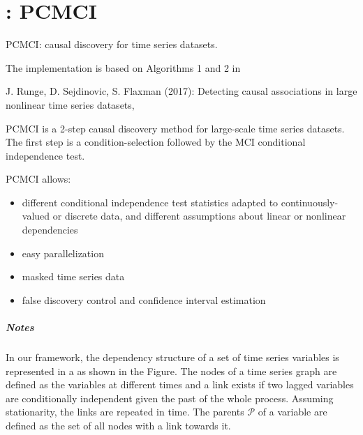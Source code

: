 \documentclass[letterpaper,10pt,english]{sphinxmanual}
\begin{document}
\chapter{: PCMCI}
\label{\detokenize{index:tigramite}}\label{\detokenize{index:tigramite-pcmci-pcmci}}

\begin{fulllineitems}
\label{\detokenize{index:tigramite.pcmci.PCMCI}}
PCMCI: causal discovery for time series datasets.

The implementation is based on Algorithms 1 and 2 in %
\begin{footnote}[1]\sphinxAtStartFootnote
J. Runge, D. Sejdinovic, S. Flaxman (2017): Detecting causal
associations in large nonlinear time series datasets,
%
\end{footnote}

PCMCI is a 2-step causal discovery method for large-scale time series
datasets. The first step is a condition-selection followed by the MCI
conditional independence test.

PCMCI allows:
\begin{itemize}
\item {} 
different conditional independence test statistics adapted to
continuously-valued or discrete data, and different assumptions about
linear or nonlinear dependencies

\item {} 
easy parallelization

\item {} 
masked time series data

\item {} 
false discovery control and confidence interval estimation

\end{itemize}
\paragraph{Notes}

\noindent{}

In our framework, the dependency structure of a set of time series variables
is represented in a  as shown in the Figure. The nodes of
a time series graph are defined as the variables at different times and a
link exists if two lagged variables are  conditionally independent
given the past of the whole process. Assuming stationarity, the links are
repeated in time. The parents \(\mathcal{P}\) of a variable are defined
as the set of all nodes with a link towards it.


\end{fulllineitems}
\end{document}

